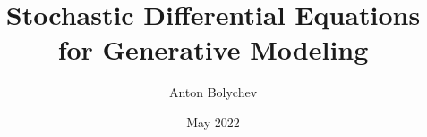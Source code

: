 
\title[%
    SDE for Generative Modeling 
]{%
    Stochastic Differential Equations for Generative Modeling 
}

\author[%
    Anton Bolycev 
]{%
    Anton Bolychev 
}

\date[%
    May 2022
]{%
    May 2022
}

